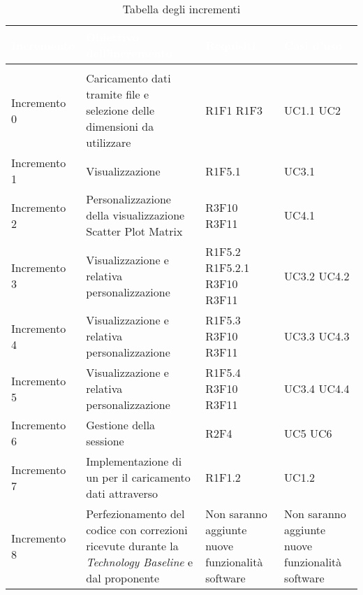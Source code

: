 \begin{longtable}{C{3cm} C{7cm} C{2cm} C{2cm}}
\textcolor{white}{\textbf{Incremento}} & 
\textcolor{white}{\textbf{Obiettivo dell'incremento}} & 
\textcolor{white}{\textbf{Requisiti}} &
\textcolor{white}{\textbf{Casi d'uso}}\\
\endfirsthead
{}\\
\endfoot
{}\caption{Tabella degli incrementi}
\endlastfoot

Incremento 0 & 
Caricamento dati tramite file e selezione delle dimensioni da utilizzare & 
R1F1 \newline R1F3 & 
UC1.1 \newline UC2\\
Incremento 1 &
Visualizzazione  & 
R1F5.1 & 
UC3.1 \\
Incremento 2 & 
Personalizzazione della visualizzazione Scatter Plot Matrix & 
R3F10 \newline R3F11 & 
UC4.1\\
Incremento 3 & 
Visualizzazione  e relativa personalizzazione & 
R1F5.2 \newline R1F5.2.1 \newline R3F10 \newline R3F11 & 
UC3.2 \newline UC4.2\\
Incremento 4 & 
Visualizzazione  e relativa personalizzazione & 
R1F5.3 \newline R3F10 \newline R3F11 & 
UC3.3 \newline UC4.3\\
Incremento 5 & 
Visualizzazione  e relativa personalizzazione & 
R1F5.4 \newline R3F10 \newline R3F11& 
UC3.4 \newline UC4.4\\
Incremento 6 & 
Gestione della sessione & 
R2F4 & 
UC5 \newline UC6\\
Incremento 7 & 
Implementazione di un  per il caricamento dati attraverso  & 
R1F1.2 & 
UC1.2\\
Incremento 8 & 
Perfezionamento del codice con correzioni ricevute durante la \textit{Technology Baseline} e dal proponente & 
Non saranno aggiunte nuove funzionalità software & 
Non saranno aggiunte nuove funzionalità software\\

\end{longtable}
